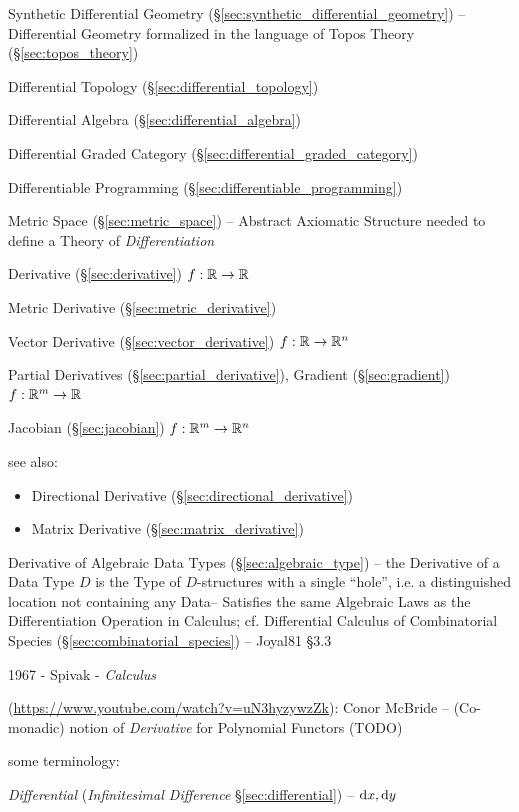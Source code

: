 {\fist Synthetic Differential Geometry
(\S\ref{sec:synthetic_differential_geometry}) --
Differential Geometry formalized in the language of Topos Theory
(\S\ref{sec:topos_theory})

\fist Differential Topology (\S\ref{sec:differential_topology})

\fist Differential Algebra (\S\ref{sec:differential_algebra})

\fist Differential Graded Category (\S\ref{sec:differential_graded_category})

\fist Differentiable Programming (\S\ref{sec:differentiable_programming})

\fist Metric Space (\S\ref{sec:metric_space}) -- Abstract Axiomatic Structure
needed to define a Theory of \emph{Differentiation}

Derivative (\S\ref{sec:derivative}) $f : \mathbb{R} \rightarrow \mathbb{R}$

Metric Derivative (\S\ref{sec:metric_derivative})

Vector Derivative (\S\ref{sec:vector_derivative})
$f : \mathbb{R} \rightarrow \mathbb{R}^n$

Partial Derivatives (\S\ref{sec:partial_derivative}), Gradient
(\S\ref{sec:gradient}) $f : \mathbb{R}^m \rightarrow \mathbb{R}$

Jacobian (\S\ref{sec:jacobian}) $f : \mathbb{R}^m \rightarrow \mathbb{R}^n$

see also:

\begin{itemize}
  \item Directional Derivative (\S\ref{sec:directional_derivative})
  \item Matrix Derivative (\S\ref{sec:matrix_derivative})
\end{itemize}

\fist Derivative of Algebraic Data Types (\S\ref{sec:algebraic_type}) -- the
Derivative of a Data Type $D$ is the Type of $D$-structures with a single
``hole'', i.e. a distinguished location not containing any Data-- Satisfies the
same Algebraic Laws as the Differentiation Operation in Calculus;
cf. Differential Calculus of Combinatorial Species
(\S\ref{sec:combinatorial_species}) -- Joyal81 \S3.3

1967 - Spivak - \emph{Calculus}

(\url{https://www.youtube.com/watch?v=uN3hyzywzZk}): Conor McBride --
(Co-monadic) notion of \emph{Derivative} for Polynomial Functors (TODO)

some terminology:

\emph{Differential} (\emph{Infinitesimal Difference} \S\ref{sec:differential})
-- $\mathrm{d}x, \mathrm{d}y$

}
